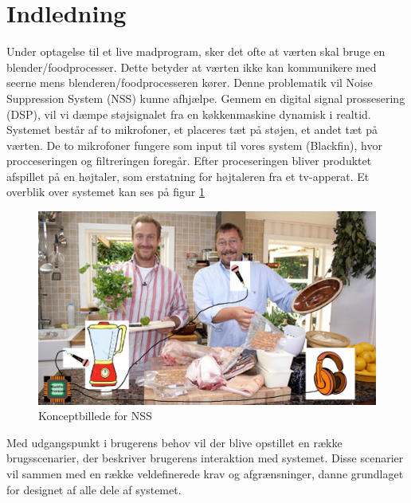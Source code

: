 \graphicspath{{Chapters/Indledning/}}

\section{Indledning}
Under optagelse til et live madprogram, sker det ofte at værten skal bruge en blender/foodprocesser. Dette betyder at værten ikke kan kommunikere med seerne mens blenderen/foodprocesseren kører. Denne problematik vil Noise Suppression System (NSS) kunne afhjælpe. Gennem en digital signal prossesering (DSP), vil vi dæmpe støjsignalet fra en køkkenmaskine dynamisk i realtid. Systemet består af to mikrofoner, et placeres tæt på støjen, et andet tæt på værten. De to mikrofoner fungere som input til vores system (Blackfin), hvor procceseringen og filtreringen foregår. Efter proceseringen bliver produktet afspillet på en højtaler, som erstatning for højtaleren fra et tv-apperat. Et overblik over systemet kan ses på figur \ref{fig:konceptbillede}

\begin{figure}[H]
	\centering
	\includegraphics[width = 400pt]{Img/Konceptbillede}
	\caption{Konceptbillede for NSS}
	\label{fig:konceptbillede}
\end{figure}

Med udgangspunkt i brugerens behov vil der blive opstillet en række brugsscenarier, der beskriver brugerens interaktion med systemet. Disse scenarier vil sammen med en række veldefinerede krav og afgrænsninger, danne grundlaget for designet af alle dele af systemet.  \\ 

\newpage

